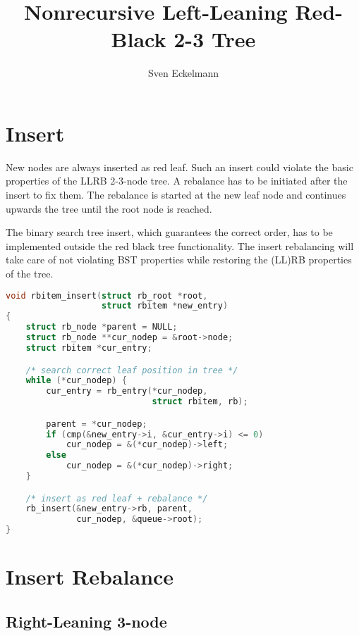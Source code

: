 \documentclass[a4paper,10pt,twoside]{article}
\date{}
\author{Sven Eckelmann}
\title{Nonrecursive Left-Leaning Red-Black 2-3 Tree}
\begin{document}
\maketitle
{}
\tableofcontents
\cleardoublepage
{}

\section{Insert}

New nodes are always inserted as red leaf. Such an insert could violate
the basic properties of the LLRB 2-3-node tree. A rebalance has to be initiated
after the insert to fix them. The rebalance is started at the new leaf node
and continues upwards the tree until the root node is reached.

The binary search tree insert, which guarantees the correct order, has to be
implemented outside the red black tree functionality. The insert rebalancing
will take care of not violating BST properties while restoring the (LL)RB
properties of the tree.

\begin{lstlisting}[language=C]
void rbitem_insert(struct rb_root *root,
                   struct rbitem *new_entry)
{
    struct rb_node *parent = NULL;
    struct rb_node **cur_nodep = &root->node;
    struct rbitem *cur_entry;

    /* search correct leaf position in tree */
    while (*cur_nodep) {
        cur_entry = rb_entry(*cur_nodep,
                             struct rbitem, rb);

        parent = *cur_nodep;
        if (cmp(&new_entry->i, &cur_entry->i) <= 0)
            cur_nodep = &(*cur_nodep)->left;
        else
            cur_nodep = &(*cur_nodep)->right;
    }

    /* insert as red leaf + rebalance */
    rb_insert(&new_entry->rb, parent,
              cur_nodep, &queue->root);
}
\end{lstlisting}

\newpage
\section{Insert Rebalance}

\subsection{Right-Leaning 3-node}
\end{document}
